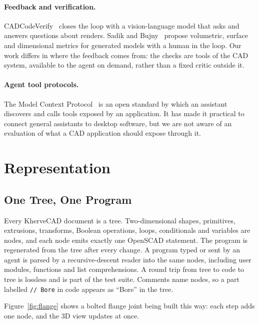 \documentclass[lineno]{asmejour}
\begin{document}
\paragraph{Feedback and verification.} CADCodeVerify~\cite{alrashedy2025cadcodeverify} closes the loop with a vision-language model that asks and answers questions about renders. Sadik and Bujny~\cite{sadik2025hitl} propose volumetric, surface and dimensional metrics for generated models with a human in the loop. Our work differs in where the feedback comes from: the checks are tools of the CAD system, available to the agent on demand, rather than a fixed critic outside it.

\paragraph{Agent tool protocols.} The Model Context Protocol~\cite{mcp} is an open standard by which an assistant discovers and calls tools exposed by an application. It has made it practical to connect general assistants to desktop software, but we are not aware of an evaluation of what a CAD application should expose through it.

\section{Representation}

\subsection{One Tree, One Program}
Every KherveCAD document is a tree. Two-dimensional shapes, primitives, extrusions, transforms, Boolean operations, loops, conditionals and variables are nodes, and each node emits exactly one OpenSCAD statement. The program is regenerated from the tree after every change. A program typed or sent by an agent is parsed by a recursive-descent reader into the same nodes, including user modules, functions and list comprehensions. A round trip from tree to code to tree is lossless and is part of the test suite. Comments name nodes, so a part labelled \texttt{// Bore} in code appears as ``Bore'' in the tree.

Figure~\ref{fig:flange} shows a bolted flange joint being built this way: each step adds one node, and the 3D view updates at once.
\end{document}

